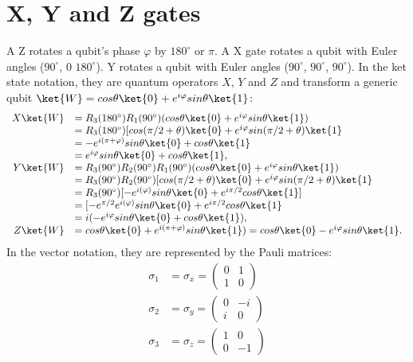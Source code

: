 \documentclass{book}
\begin{document}
\section{X, Y and Z gates}
A Z rotates a qubit's phase $\varphi$ by $180^{\circ}$ or $\pi$. A X gate rotates a qubit with Euler angles ($90^{\circ}$, 0 $180^{\circ}$). Y rotates a qubit with Euler angles ($90^{\circ}$, $90^{\circ}$, $90^{\circ}$). In the ket state notation, they are quantum operators $X$, $Y$ and $Z$ and transform a generic qubit $\ket{W} = cos\theta \ket{0}+e^{i\varphi} sin\theta \ket{1}$:
\begin{equation}
\begin{array}{rl}
     X \ket{W} & = R_3(180^\circ) R_1(90^\circ) (cos\theta \ket{0} + e^{i\varphi} sin\theta\ket{1}) \\
     & = R_3(180^\circ)[cos(\pi/2 +\theta) \ket{0} + e^{i\varphi} sin(\pi/2 + \theta)\ket{1} \\
     & = -e^{i(\pi+\varphi)} sin\theta \ket{0}+cos\theta \ket{1} \\
     & = e^{i\varphi} sin\theta \ket{0}+cos\theta \ket{1}, \\
    Y \ket{W} & = R_3(90^\circ)R_2(90^\circ)R_1(90^\circ)(cos\theta \ket{0} + e^{i\varphi} sin\theta\ket{1}) \\
    & = R_3(90^\circ)R_2(90^\circ)[cos(\pi/2 +\theta) \ket{0} + e^{i\varphi} sin(\pi/2 + \theta)\ket{1} \\
    & = R_3(90^\circ)[-e^{i(\varphi)} sin\theta \ket{0}+e^{i\pi/2} cos\theta \ket{1}] \\
    & = [-e^{\pi/2}e^{i(\varphi)} sin\theta \ket{0}+e^{i\pi/2} cos\theta \ket{1} \\
    & = i (-e^{i\varphi} sin\theta \ket{0}+ cos\theta \ket{1}), \\
     Z \ket{W} & = cos\theta \ket{0}+e^{i(\pi+\varphi)} sin\theta \ket{1}) = cos\theta \ket{0}-e^{i\varphi} sin\theta \ket{1}.
\end{array}
\end{equation}
In the vector notation, they are represented by the Pauli matrices:
\begin{equation}
\begin{array}{rl}
    \sigma_1 & = \sigma_x = \begin{pmatrix}
        0 & 1 \\
        1 & 0
    \end{pmatrix} \\
    \sigma_2 & = \sigma_y = \begin{pmatrix}
        0 & -i \\
        i & 0
    \end{pmatrix} \\
    \sigma_3 & = \sigma_z = \begin{pmatrix}
        1 & 0 \\
        0 & -1
    \end{pmatrix}
\end{array}
\end{equation}
\end{document}
